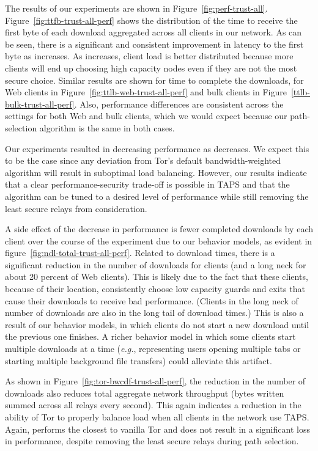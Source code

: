 \documentclass[conference]{styles/IEEEtran}
\newcommand{\eg}{\emph{e.g.}}
\newcommand{\ps}{TAPS\xspace}
\begin{document}
The results of our experiments are shown in Figure~\ref{fig:perf-trust-all}.
Figure~\ref{fig:ttfb-trust-all-perf} shows the distribution of the time to
receive the first byte of each download aggregated across all clients in our
network. As can be seen, there is a significant and consistent improvement in
latency to the first byte as  increases. As  increases,
client load is better distributed because more clients will end up choosing high
capacity nodes even if they are not the most secure choice. Similar results are
shown for time to complete the downloads, for Web clients in
Figure~\ref{fig:ttlb-web-trust-all-perf} and bulk clients in
Figure~\ref{ttlb-bulk-trust-all-perf}. Also,
performance differences are consistent across the  settings for both Web and
bulk clients, which we would expect because our path-selection algorithm is the same in
both cases.

Our experiments resulted in decreasing performance as  decreases. We expect this
to be the case since any deviation from Tor's default bandwidth-weighted algorithm
will result in suboptimal load balancing. However, our results indicate that a clear
performance-security trade-off is possible in \ps and that the algorithm
can be tuned to a desired level of performance while still removing the least
secure relays from consideration.

A side effect of the decrease in performance is fewer completed downloads by
each client over the course of the experiment due to our behavior models,
as evident in figure~\ref{fig:ndl-total-trust-all-perf}.
Related to download times, there is a significant reduction in the
number of downloads for clients (and a long neck for about 20 percent of Web
clients). This is likely due to the fact that these clients, because of their
location, consistently choose low capacity guards and exits that cause their
downloads to receive bad performance. (Clients in the long neck of number of
downloads are also in the long tail of download times.) This is also a result of
our behavior models, in which clients do not start a new download until the
previous one finishes. A richer behavior model in which some clients start multiple
downloads at a time (\eg{}, representing users opening multiple tabs or starting
multiple background file transfers) could alleviate this artifact.



As shown in Figure~\ref{fig:tor-bwcdf-trust-all-perf}, the reduction in the
number of downloads also reduces total aggregate network throughput (bytes
written summed across all relays every second). This again indicates a reduction
in the ability of Tor to properly balance load when all clients in the network use \ps.
Again,  performs the closest to vanilla Tor and does not result in a significant loss in performance, despite removing the least secure relays during path selection.
\end{document}
